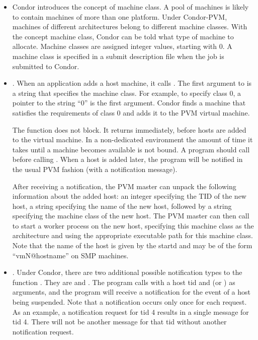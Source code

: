 \begin{itemize}

\item Condor introduces the concept of machine class.
  A pool of machines is likely to contain machines of more than
  one platform.
  Under Condor-PVM, machines of
  different architectures belong to different machine classes.
  With the concept machine class,
  Condor can be told what type
  of machine to allocate.
  Machine classes are assigned integer values, starting with 0.
  A machine class is
  specified in a submit description file when the job
  is submitted to Condor.

\item {}.  When an application
  adds a host machine, it calls .
  The first argument to 
  is a string that specifies the machine class.
  For example, to specify class 0, a pointer to the string ``0''
  is the first argument.  Condor finds a machine
  that satisfies the requirements of class 0 and adds it to the PVM
  virtual machine.

  The function  does not block.  It
  returns immediately, before hosts are added to the virtual
  machine.  
  In a non-dedicated environment the amount of time it takes until
  a machine becomes available is not bound.
  A program should call 
   before calling
  . When a host is added later, the program
  will be notified in the usual PVM 
  fashion (with a  notification message).

  After receiving a  notification, the PVM master can
  unpack the following information about the added host: an integer
  specifying the TID of the new host, a string specifying the name of
  the new host, followed by a string specifying the machine class of
  the new host.  The PVM master can then call  to
  start a worker process on the new host, specifying this machine
  class as the architecture and using the appropriate executable path
  for this machine class.  Note that the name of the host is given by
  the startd and may be of the form ``vmN@hostname'' on SMP machines.
    

\item {}.  Under Condor, there are two additional 
  possible notification types
  to the function .
  They are  and
  .
  The program calls 
  with a host tid and  (or )
  as arguments, and the program will receive
  a notification for the event of a host being suspended.
  Note that a notification occurs only once for each request.
  As an example,
  a  
  notification request for tid 4 results in a single 
  message for tid 4. 
  There will not be another  message for
  that tid without another notification request.


\end{itemize}
